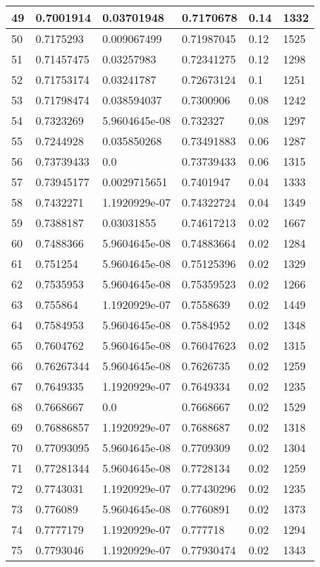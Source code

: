 \begin{longtable}{|l|l|l|l|l|l|}
49 & 0.7001914 & 0.03701948 & 0.7170678 & 0.14 & 1332 \\ \hline 
50 & 0.7175293 & 0.009067499 & 0.71987045 & 0.12 & 1525 \\ \hline 
51 & 0.71457475 & 0.03257983 & 0.72341275 & 0.12 & 1298 \\ \hline 
52 & 0.71753174 & 0.03241787 & 0.72673124 & 0.1 & 1251 \\ \hline 
53 & 0.71798474 & 0.038594037 & 0.7300906 & 0.08 & 1242 \\ \hline 
54 & 0.7323269 & 5.9604645e-08 & 0.732327 & 0.08 & 1297 \\ \hline 
55 & 0.7244928 & 0.035850268 & 0.73491883 & 0.06 & 1287 \\ \hline 
56 & 0.73739433 & 0.0 & 0.73739433 & 0.06 & 1315 \\ \hline 
57 & 0.73945177 & 0.0029715651 & 0.7401947 & 0.04 & 1333 \\ \hline 
58 & 0.7432271 & 1.1920929e-07 & 0.74322724 & 0.04 & 1349 \\ \hline 
59 & 0.7388187 & 0.03031855 & 0.74617213 & 0.02 & 1667 \\ \hline 
60 & 0.7488366 & 5.9604645e-08 & 0.74883664 & 0.02 & 1284 \\ \hline 
61 & 0.751254 & 5.9604645e-08 & 0.75125396 & 0.02 & 1329 \\ \hline 
62 & 0.7535953 & 5.9604645e-08 & 0.75359523 & 0.02 & 1266 \\ \hline 
63 & 0.755864 & 1.1920929e-07 & 0.7558639 & 0.02 & 1449 \\ \hline 
64 & 0.7584953 & 5.9604645e-08 & 0.7584952 & 0.02 & 1348 \\ \hline 
65 & 0.7604762 & 5.9604645e-08 & 0.76047623 & 0.02 & 1315 \\ \hline 
66 & 0.76267344 & 5.9604645e-08 & 0.7626735 & 0.02 & 1259 \\ \hline 
67 & 0.7649335 & 1.1920929e-07 & 0.7649334 & 0.02 & 1235 \\ \hline 
68 & 0.7668667 & 0.0 & 0.7668667 & 0.02 & 1529 \\ \hline 
69 & 0.76886857 & 1.1920929e-07 & 0.7688687 & 0.02 & 1318 \\ \hline 
70 & 0.77093095 & 5.9604645e-08 & 0.7709309 & 0.02 & 1304 \\ \hline 
71 & 0.77281344 & 5.9604645e-08 & 0.7728134 & 0.02 & 1259 \\ \hline 
72 & 0.7743031 & 1.1920929e-07 & 0.77430296 & 0.02 & 1235 \\ \hline 
73 & 0.776089 & 5.9604645e-08 & 0.7760891 & 0.02 & 1373 \\ \hline 
74 & 0.7777179 & 1.1920929e-07 & 0.777718 & 0.02 & 1294 \\ \hline 
75 & 0.7793046 & 1.1920929e-07 & 0.77930474 & 0.02 & 1343 \\ \hline 
\end{longtable}